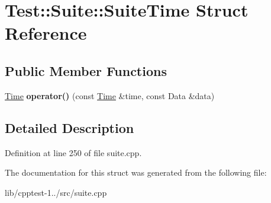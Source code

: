 \hypertarget{struct_test_1_1_suite_1_1_suite_time}{}\section{Test\+:\+:Suite\+:\+:Suite\+Time Struct Reference}
\label{struct_test_1_1_suite_1_1_suite_time}
\subsection*{Public Member Functions}
\begin{DoxyCompactItemize}
\item 
\hyperlink{class_test_1_1_time}{Time} {\bfseries operator()} (const \hyperlink{class_test_1_1_time}{Time} \&time, const Data \&data)\hypertarget{struct_test_1_1_suite_1_1_suite_time_a286496110a79cecb0fe3cc05d0a918a8}{}\label{struct_test_1_1_suite_1_1_suite_time_a286496110a79cecb0fe3cc05d0a918a8}

\end{DoxyCompactItemize}


\subsection{Detailed Description}


Definition at line 250 of file suite.\+cpp.



The documentation for this struct was generated from the following file\+:\begin{DoxyCompactItemize}
\item 
lib/cpptest-\/1../src/suite.\+cpp\end{DoxyCompactItemize}

